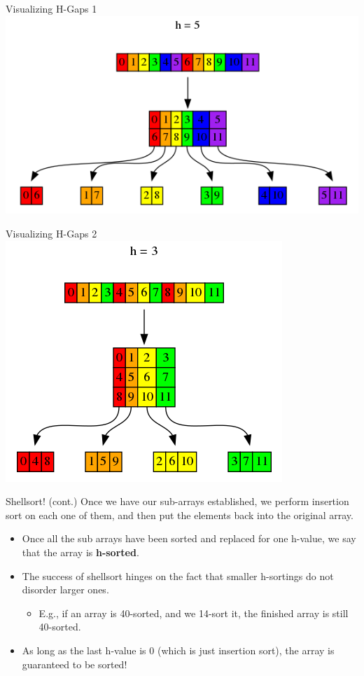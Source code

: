 \documentclass[11pt]{beamer}
\begin{document}
\begin{frame}{Visualizing H-Gaps 1}
\center
\includegraphics[scale=0.5]{graphs/shellsortSlicing.png}
\end{frame}

\begin{frame}{Visualizing H-Gaps 2}
\center
\includegraphics[scale=0.5]{graphs/shellsortSlicing2.png}
\end{frame}

\begin{frame}[fragile=singleslide]{Shellsort! (cont.)}
Once we have our sub-arrays established, we perform insertion sort on each one of them, and then put the elements back into the original array.
\begin{itemize}
\item Once all the sub arrays have been sorted and replaced for one h-value, we say that the array is \textbf{h-sorted}.  
\item The success of shellsort hinges on the fact that smaller h-sortings do not disorder larger ones. 
\begin{itemize}
\item E.g., if an array is 40-sorted, and we 14-sort it, the finished array is still 40-sorted.  
\end{itemize}
\item As long as the last h-value is 0 (which is just insertion sort), the array is guaranteed to be sorted!
\end{itemize}
\end{frame}
\end{document}
